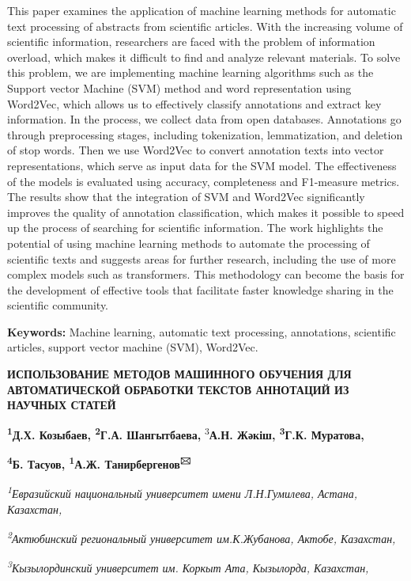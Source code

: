 \documentclass[
]{article}
\begin{document}
This paper examines the application of machine learning methods for
automatic text processing of abstracts from scientific articles. With
the increasing volume of scientific information, researchers are faced
with the problem of information overload, which makes it difficult to
find and analyze relevant materials. To solve this problem, we are
implementing machine learning algorithms such as the Support vector
Machine (SVM) method and word representation using Word2Vec, which
allows us to effectively classify annotations and extract key
information. In the process, we collect data from open databases.
Annotations go through preprocessing stages, including tokenization,
lemmatization, and deletion of stop words. Then we use Word2Vec to
convert annotation texts into vector representations, which serve as
input data for the SVM model. The effectiveness of the models is
evaluated using accuracy, completeness and F1-measure metrics. The
results show that the integration of SVM and Word2Vec significantly
improves the quality of annotation classification, which makes it
possible to speed up the process of searching for scientific
information. The work highlights the potential of using machine learning
methods to automate the processing of scientific texts and suggests
areas for further research, including the use of more complex models
such as transformers. This methodology can become the basis for the
development of effective tools that facilitate faster knowledge sharing
in the scientific community.

\textbf{Keywords:} Machine learning, automatic text processing,
annotations, scientific articles, support vector machine (SVM),
Word2Vec.

\textbf{ИСПОЛЬЗОВАНИЕ МЕТОДОВ МАШИННОГО ОБУЧЕНИЯ ДЛЯ АВТОМАТИЧЕСКОЙ
ОБРАБОТКИ ТЕКСТОВ АННОТАЦИЙ ИЗ НАУЧНЫХ СТАТЕЙ}

\textbf{\textsuperscript{1}Д.Х. Козыбаев, \textsuperscript{2}Г.А.
Шангытбаева,} \textsuperscript{3}\textbf{А.Н. Жәкіш,
\textsuperscript{3}Г.К. Муратова,}

\textbf{\textsuperscript{4}Б. Тасуов, \textsuperscript{1}А.Ж.
Танирбергенов\textsuperscript{🖂}}

\emph{\textsuperscript{1}Евразийский национальный университет имени
Л.Н.Гумилева, Астана, Казахстан,}

\emph{\textsuperscript{2}Актюбинский региональный университет
им.К.Жубанова, Актобе, Казахстан,}

\emph{\textsuperscript{3}Кызылординский университет им. Коркыт Ата,
Кызылорда, Казахстан,}
\end{document}
